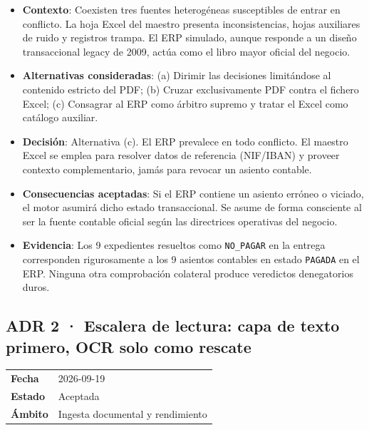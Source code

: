 \documentclass[11pt,a4paper]{article}
\begin{document}
\begin{itemize}[leftmargin=*, label={--}]
    \item \textbf{Contexto}: Coexisten tres fuentes heterogéneas susceptibles de entrar en conflicto. La hoja Excel del maestro presenta inconsistencias, hojas auxiliares de ruido y registros trampa. El ERP simulado, aunque responde a un diseño transaccional legacy de 2009, actúa como el libro mayor oficial del negocio.
    \item \textbf{Alternativas consideradas}: (a) Dirimir las decisiones limitándose al contenido estricto del PDF; (b) Cruzar exclusivamente PDF contra el fichero Excel; (c) Consagrar al ERP como árbitro supremo y tratar el Excel como catálogo auxiliar.
    \item \textbf{Decisión}: Alternativa (c). El ERP prevalece en todo conflicto. El maestro Excel se emplea para resolver datos de referencia (NIF/IBAN) y proveer contexto complementario, jamás para revocar un asiento contable.
    \item \textbf{Consecuencias aceptadas}: Si el ERP contiene un asiento erróneo o viciado, el motor asumirá dicho estado transaccional. Se asume de forma consciente al ser la fuente contable oficial según las directrices operativas del negocio.
    \item \textbf{Evidencia}: Los 9 expedientes resueltos como \texttt{NO\_PAGAR} en la entrega corresponden rigurosamente a los 9 asientos contables en estado \texttt{PAGADA} en el ERP. Ninguna otra comprobación colateral produce veredictos denegatorios duros.
\end{itemize}

\subsection{ADR 2 · Escalera de lectura: capa de texto primero, OCR solo como rescate}
\begin{table}[htbp]
\centering\small
\begin{tabular}{ll}
\toprule
\textbf{Fecha} & 2026-09-19 \\
\textbf{Estado} & Aceptada \\
\textbf{Ámbito} & Ingesta documental y rendimiento \\
\bottomrule
\end{tabular}
\end{table}
\end{document}
